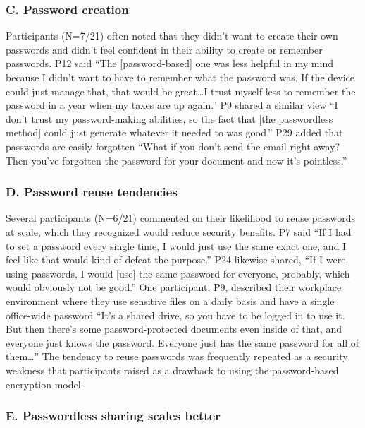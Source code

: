\subsubsection*{C. Password creation}

Participants (N=7/21) often noted that they didn't want to create their own passwords and didn't feel confident in their ability to create or remember passwords. P12 said ``The [password-based] one was less helpful in my mind because I didn't want to have to remember what the password was. If the device could just manage that, that would be great\ldots I trust myself less to remember the password in a year when my taxes are up again.'' P9 shared a similar view ``I don't trust my password-making abilities, so the fact that [the passwordless method] could just generate whatever it needed to was good.'' P29 added that passwords are easily forgotten ``What if you don't send the email right away? Then you've forgotten the password for your document and now it's pointless.''

\subsubsection*{D. Password reuse tendencies}

Several participants (N=6/21) commented on their likelihood to reuse passwords at scale, which they recognized would reduce security benefits. P7 said ``If I had to set a password every single time, I would just use the same exact one, and I feel like that would kind of defeat the purpose.'' P24 likewise shared, ``If I were using passwords, I would [use] the same password for everyone, probably, which would obviously not be good.'' One participant, P9, described their workplace environment where they use sensitive files on a daily basis and have a single office-wide password ``It's a shared drive, so you have to be logged in to use it. But then there's some password-protected documents even inside of that, and everyone just knows the password. Everyone just has the same password for all of them\ldots'' The tendency to reuse passwords was frequently repeated as a security weakness that participants raised as a drawback to using the password-based encryption model.

\subsubsection*{E. Passwordless sharing scales better}

